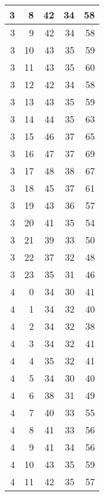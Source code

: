 \begin{longtable}{|r|r|r|r|r|}
    \hline
    3     & 8     & 42    & 34    & 58 \\
    \hline
    3     & 9     & 42    & 34    & 58 \\
    \hline
    3     & 10    & 43    & 35    & 59 \\
    \hline
    3     & 11    & 43    & 35    & 60 \\
    \hline
    3     & 12    & 42    & 34    & 58 \\
    \hline
    3     & 13    & 43    & 35    & 59 \\
    \hline
    3     & 14    & 44    & 35    & 63 \\
    \hline
    3     & 15    & 46    & 37    & 65 \\
    \hline
    3     & 16    & 47    & 37    & 69 \\
    \hline
    3     & 17    & 48    & 38    & 67 \\
    \hline
    3     & 18    & 45    & 37    & 61 \\
    \hline
    3     & 19    & 43    & 36    & 57 \\
    \hline
    3     & 20    & 41    & 35    & 54 \\
    \hline
    3     & 21    & 39    & 33    & 50 \\
    \hline
    3     & 22    & 37    & 32    & 48 \\
    \hline
    3     & 23    & 35    & 31    & 46 \\
    \hline
    4     & 0     & 34    & 30    & 41 \\
    \hline
    4     & 1     & 34    & 32    & 40 \\
    \hline
    4     & 2     & 34    & 32    & 38 \\
    \hline
    4     & 3     & 34    & 32    & 41 \\
    \hline
    4     & 4     & 35    & 32    & 41 \\
    \hline
    4     & 5     & 34    & 30    & 40 \\
    \hline
    4     & 6     & 38    & 31    & 49 \\
    \hline
    4     & 7     & 40    & 33    & 55 \\
    \hline
    4     & 8     & 41    & 33    & 56 \\
    \hline
    4     & 9     & 41    & 34    & 56 \\
    \hline
    4     & 10    & 43    & 35    & 59 \\
    \hline
    4     & 11    & 42    & 35    & 57 \\

\end{longtable}

